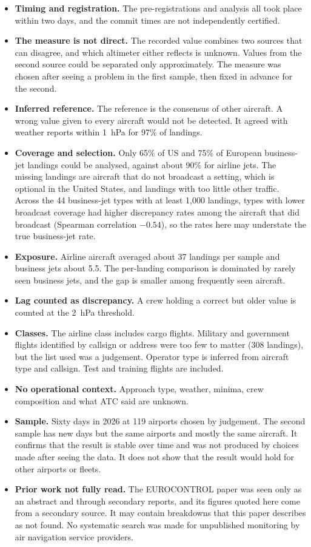\documentclass[11pt]{article}
\begin{document}
\begin{itemize}
\item \textbf{Timing and registration.} The pre-registrations and analysis all took place within two days, and the commit times are not independently certified.
\item \textbf{The measure is not direct.} The recorded value combines two sources that can disagree, and which altimeter either reflects is unknown. Values from the second source could be separated only approximately. The measure was chosen after seeing a problem in the first sample, then fixed in advance for the second.
\item \textbf{Inferred reference.} The reference is the consensus of other aircraft. A wrong value given to every aircraft would not be detected. It agreed with weather reports within 1~hPa for 97\% of landings.
\item \textbf{Coverage and selection.} Only 65\% of US and 75\% of European business-jet landings could be analysed, against about 90\% for airline jets. The missing landings are aircraft that do not broadcast a setting, which is optional in the United States, and landings with too little other traffic. Across the 44 business-jet types with at least 1{,}000 landings, types with lower broadcast coverage had higher discrepancy rates among the aircraft that did broadcast (Spearman correlation $-0.54$), so the rates here may understate the true business-jet rate.
\item \textbf{Exposure.} Airline aircraft averaged about 37 landings per sample and business jets about 5.5. The per-landing comparison is dominated by rarely seen business jets, and the gap is smaller among frequently seen aircraft.
\item \textbf{Lag counted as discrepancy.} A crew holding a correct but older value is counted at the 2~hPa threshold.
\item \textbf{Classes.} The airline class includes cargo flights. Military and government flights identified by callsign or address were too few to matter (308 landings), but the list used was a judgement. Operator type is inferred from aircraft type and callsign. Test and training flights are included.
\item \textbf{No operational context.} Approach type, weather, minima, crew composition and what ATC said are unknown.
\item \textbf{Sample.} Sixty days in 2026 at 119 airports chosen by judgement. The second sample has new days but the same airports and mostly the same aircraft. It confirms that the result is stable over time and was not produced by choices made after seeing the data. It does not show that the result would hold for other airports or fleets.
\item \textbf{Prior work not fully read.} The EUROCONTROL paper was seen only as an abstract and through secondary reports, and its figures quoted here come from a secondary source. It may contain breakdowns that this paper describes as not found. No systematic search was made for unpublished monitoring by air navigation service providers.
\end{itemize}
\end{document}
